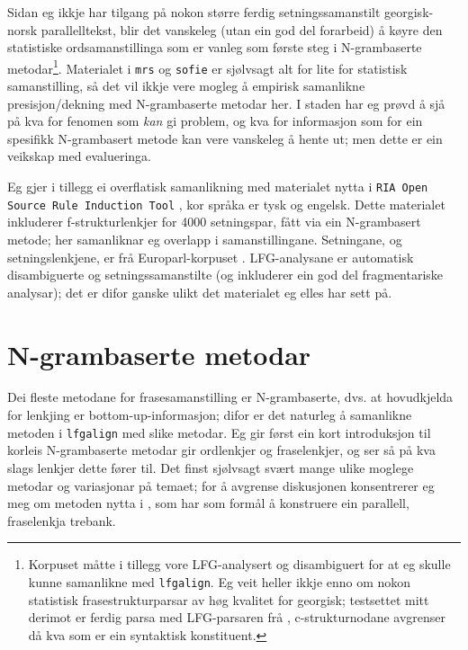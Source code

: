 \documentclass[11pt,a4paper,oneside,draft]{report}
\begin{document}
 Sidan eg ikkje har tilgang på nokon større ferdig setningssamanstilt
 georgisk-norsk parallelltekst, blir det vanskeleg (utan ein god del
 forarbeid) å køyre den statistiske ordsamanstillinga som er vanleg
 som første steg i N-grambaserte metodar\footnote{Korpuset måtte i tillegg vore LFG-analysert og disambiguert
        for at eg skulle kunne samanlikne med \texttt{lfgalign}. Eg veit
        heller ikkje enno om nokon statistisk frasestrukturparsar av
        høg kvalitet for georgisk; testsettet mitt derimot er ferdig
        parsa med LFG-parsaren frå \citet{meurer2008cgg},
        c-strukturnodane avgrenser då kva som er ein syntaktisk
        konstituent. }.  Materialet i \texttt{mrs}
 og \texttt{sofie} er sjølvsagt alt for lite for statistisk samanstilling, så
 det vil ikkje vere mogleg å empirisk samanlikne presisjon/dekning med
 N-grambaserte metodar her. I staden har eg prøvd å sjå på kva for
 fenomen som \emph{kan} gi problem, og kva for informasjon som for ein
 spesifikk N-grambasert metode kan vere vanskeleg å hente ut; men
 dette er ein veikskap med evalueringa.

 Eg gjer i tillegg ei overflatisk samanlikning med materialet nytta i
 \texttt{RIA Open Source Rule Induction Tool}
 \citep{graham2009osr,graham2009fts}, kor språka er tysk og
 engelsk. Dette materialet inkluderer f-strukturlenkjer for 4000
 setningspar, fått via ein N-grambasert metode; her samanliknar eg
 overlapp i samanstillingane.  Setningane, og setningslenkjene, er frå
 Europarl-korpuset \citep{koehn2005emc}. LFG-analysane er automatisk
 disambiguerte og setningssamanstilte (og inkluderer ein god del
 fragmentariske analysar); det er difor ganske ulikt det materialet eg
 elles har sett på.

\section{N-grambaserte metodar}
\label{sec-5.2}


 Dei fleste metodane for frasesamanstilling er N-grambaserte, dvs. at
 hovudkjelda for lenkjing er bottom-up-informasjon; difor er det
 naturleg å samanlikne metoden i \texttt{lfgalign} med slike metodar. Eg gir
 først ein kort introduksjon til korleis N-grambaserte metodar gir
 ordlenkjer og fraselenkjer, og ser så på kva slags lenkjer dette
 fører til. Det finst sjølvsagt svært mange ulike moglege metodar og
 variasjonar på temaet; for å avgrense diskusjonen konsentrerer eg meg
 om metoden nytta i \citet{samuelsson2007apa}, som har som formål å
 konstruere ein parallell, fraselenkja trebank.
\end{document}
